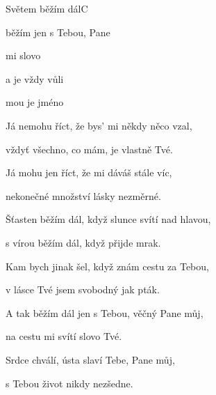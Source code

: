 \begin{song}{Světem běžím dál}{C}{}

\begin{SBVerse}

 běžím  jen s Tebou,  Pane  

 mi  slovo 

 a  je vždy  vůli 

 mou je  jméno 

\end{SBVerse}

\begin{SBChorus}

Já nemohu říct, že bys' mi někdy něco vzal,

vždyť všechno, co mám, je vlastně Tvé.

Já mohu jen říct, že mi dáváš stále víc,

nekonečné množství lásky nezměrné.

\end{SBChorus}

\begin{SBVerse}

Šťasten běžím dál, když slunce svítí nad hlavou,

s vírou běžím dál, když přijde mrak.

Kam bych jinak šel, když znám cestu za Tebou,

v lásce Tvé jsem svobodný jak pták.

\end{SBVerse}

\begin{SBVerse}

A tak běžím dál jen s Tebou, věčný Pane můj,

na cestu mi svítí slovo Tvé.

Srdce chválí, ústa slaví Tebe, Pane můj,

s Tebou život nikdy nezšedne.

\end{SBVerse}

\end{song}
